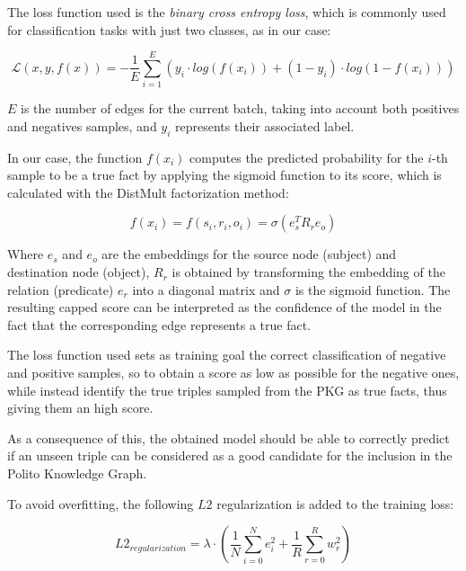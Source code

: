 \documentclass[%
    corpo=13.5pt,
    twoside,
    oldstyle,
    tipotesi=magistrale,
    greek,
    evenboxes
]{toptesi}
\begin{document}
The loss function used is the \emph{binary cross entropy loss}, which is
commonly used for classification tasks with just two classes, as in our case:

\begin{equation}
    \mathcal{L} \left( x, y, f(x) \right) =
        - \frac{1}{E} \sum_{i=1}^{E} \left(
        y_i \cdot log(f(x_i)) +
        (1-y_i) \cdot log(1-f(x_i))
    \right)
\end{equation}

$E$ is the number of edges for the current batch, taking into account both
positives and negatives samples, and $y_i$ represents their associated label.

In our case, the function $f(x_i)$ computes the predicted probability for the
$i$-th sample to be a true fact by applying the sigmoid function to its score,
which is calculated with the DistMult factorization method:

\begin{equation}
    f(x_i) = f(s_i,r_i,o_i) = \sigma \left( e_s^T R_r e_o \right)
\end{equation}

Where $e_s$ and $e_o$ are the embeddings for the source node (subject) and
destination node (object), $R_r$ is obtained by transforming the embedding
of the relation (predicate) $e_r$ into a diagonal matrix and $\sigma$ is the
sigmoid function.
The resulting capped score can be interpreted as the confidence of the model in
the fact that the corresponding edge represents a true fact.

The loss function used sets as training goal the correct classification of
negative and positive samples, so to obtain a score as low as possible for the
negative ones, while instead identify the true triples sampled from the PKG as
true facts, thus giving them an high score.

As a consequence of this, the obtained model should be able to correctly
predict if an unseen triple can be considered as a good candidate for the
inclusion in the Polito Knowledge Graph.

To avoid overfitting, the following $L2$ regularization is added to the
training loss:

\begin{equation}
    L2_{regularization} = \lambda \cdot \left(\frac{1}{N}\sum_{i=0}^{N} e_{i}^2 + \frac{1}{R}\sum_{r=0}^{R} w_{r}^2 \right)
\end{equation}
\end{document}
